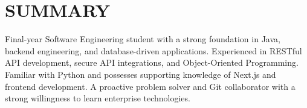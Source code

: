 \section{SUMMARY}
\noindent Final-year Software Engineering student with a strong foundation in Java, backend engineering, and database-driven applications. Experienced in RESTful API development, secure API integrations, and Object-Oriented Programming. Familiar with Python and possesses supporting knowledge of Next.js and frontend development. A proactive problem solver and Git collaborator with a strong willingness to learn enterprise technologies.
